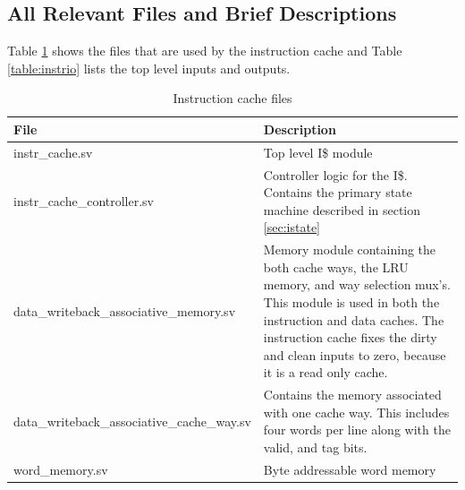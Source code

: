 \subsection{All Relevant Files and Brief Descriptions}

	Table \ref{table:irel} shows the files that are used by the instruction cache and Table \ref{table:instrio} lists the top level inputs and outputs.

	\begin{table}
	\label{table:irel}
	\begin{tabular}{|l|p{70mm}|}
	\hline File  & Description \\ 
	\hline  instr\_cache.sv & Top level I\$ module \\ 
	\hline  instr\_cache\_controller.sv & Controller logic for the I\$.
	Contains the primary state machine described in section \ref{sec:istate} \\ 
	\hline  data\_writeback\_associative\_memory.sv & 
	Memory module containing the both cache ways, the LRU memory, and way selection mux's.
	This module is used in both the instruction and data caches.
	The instruction cache fixes the dirty and clean inputs to zero, because it is a read only cache.\\ 
	\hline  data\_writeback\_associative\_cache\_way.sv & 
	Contains the memory associated with one cache way. This includes four words per line along with the valid, and tag bits. \\ 
	\hline  word\_memory.sv & Byte addressable word memory  \\
	\hline
	\end{tabular} 
	\caption{Instruction cache files}
	\end{table}


